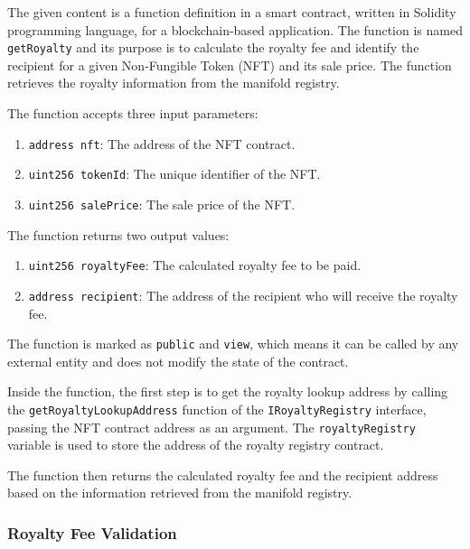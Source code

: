 The given content is a function definition in a smart contract, written
in Solidity programming language, for a blockchain-based application.
The function is named \texttt{getRoyalty} and its purpose is to
calculate the royalty fee and identify the recipient for a given
Non-Fungible Token (NFT) and its sale price. The function retrieves the
royalty information from the manifold registry.

The function accepts three input parameters:

\begin{enumerate}
\def\labelenumi{\arabic{enumi}.}
\tightlist
\item
  \texttt{address\ nft}: The address of the NFT contract.
\item
  \texttt{uint256\ tokenId}: The unique identifier of the NFT.
\item
  \texttt{uint256\ salePrice}: The sale price of the NFT.
\end{enumerate}

The function returns two output values:

\begin{enumerate}
\def\labelenumi{\arabic{enumi}.}
\tightlist
\item
  \texttt{uint256\ royaltyFee}: The calculated royalty fee to be paid.
\item
  \texttt{address\ recipient}: The address of the recipient who will
  receive the royalty fee.
\end{enumerate}

The function is marked as \texttt{public} and \texttt{view}, which means
it can be called by any external entity and does not modify the state of
the contract.

Inside the function, the first step is to get the royalty lookup address
by calling the \texttt{getRoyaltyLookupAddress} function of the
\texttt{IRoyaltyRegistry} interface, passing the NFT contract address as
an argument. The \texttt{royaltyRegistry} variable is used to store the
address of the royalty registry contract.

The function then returns the calculated royalty fee and the recipient
address based on the information retrieved from the manifold registry.

\hypertarget{royalty-fee-validation}{%
\subsubsection{Royalty Fee Validation}\label{royalty-fee-validation}}

